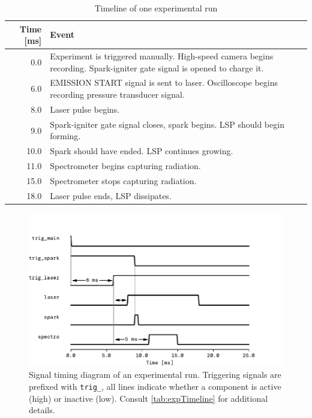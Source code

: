                 \begin{table}[h]
                    \centering
                    \caption{Timeline of one experimental run}
                    \label{tab:expTimeline}
                    \begin{tabularx}{\textwidth}{rX}
                        \toprule
                        Time [ms]   & Event \\
                        \midrule
                        0.0         & Experiment is triggered manually. High-speed camera begins recording. Spark-igniter gate signal is opened to charge it. \\
                        6.0         & EMISSION START signal is sent to laser. Oscilloscope begins recording pressure transducer signal. \\
                        8.0         & Laser pulse begins.    \\
                        9.0         & Spark-igniter gate signal closes, spark begins. LSP should begin forming. \\
                        10.0        & Spark should have ended. LSP continues growing.   \\
                        11.0        & Spectrometer begins capturing radiation.  \\
                        15.0        & Spectrometer stops capturing radiation.   \\
                        18.0        & Laser pulse ends, LSP dissipates. \\
                        \bottomrule
                    \end{tabularx}
                \end{table}
                
                \begin{figure}[h]
                    \centering
                    \includegraphics[]{assets/3 design/timings}
                    \caption[Signal timing diagram of an experimental run]{Signal timing diagram of an experimental run. Triggering signals are prefixed with \texttt{trig\_}, all lines indicate whether a component is active (high) or inactive (low). Consult \autoref{tab:expTimeline} for additional details.}
                    \label{fig:timings}
                \end{figure}
                
